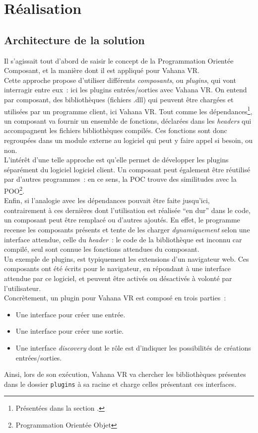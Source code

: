 \section{Réalisation}
\subsection{Architecture de la solution}
Il s'agissait tout d'abord de saisir le concept de la Programmation Orientée Composant, et la manière
dont il est appliqué pour Vahana VR.\\
Cette approche propose d'utiliser différents \emph{composants}, ou \textit{plugins},
qui vont interragir entre eux~: ici les plugins entrées/sorties avec Vahana VR. On entend
par composant, des bibliothèques (fichiers .dll) qui peuvent être chargées et utilisées
par un programme client, ici Vahana VR. Tout comme les dépendances\footnote{Présentées dans 
la section .}, un composant va fournir un ensemble
de fonctions, déclarées dans les \textit{headers} qui accompagnent les
fichiers bibliothèques compilés. Ces fonctions sont donc regroupées dans un module externe
au logiciel qui peut y faire appel si besoin, ou non.\\
L'intérêt d'une telle approche est qu'elle permet de développer les plugins séparément du logiciel
logiciel client. Un composant peut également être réutilisé par d'autres programmes~: en ce sens, la POC trouve
des similitudes avec la POO\footnote{Programmation Orientée Objet}.\\
Enfin, si l'analogie avec les dépendances pouvait être faite jusqu'ici, contrairement à ces
dernières dont l'utilisation est réalisée \enquote{en dur} dans le code, un composant
peut être remplacé ou d'autres ajoutés. En effet, le programme recense les composants
présents et tente de les charger \emph{dynamiquement} selon une interface attendue, celle du
\textit{header}~: le code de la bibliothèque est inconnu car compilé, seul sont
connue les fonctions attendues du composant.\\
Un exemple de plugins, est typiquement les extensions d'un navigateur web. Ces composants
ont été écrits pour le navigateur, en répondant à une interface attendue par ce logiciel,
et peuvent être activés ou désactivés à volonté par l'utilisateur.\\
\newline
Concrètement, un plugin pour Vahana VR est composé en trois parties~:
\begin{itemize}
  \item Une interface pour créer une entrée.
  \item Une interface pour créer une sortie.
  \item Une interface \textit{discovery} dont le rôle est d'indiquer les possibilités
    de créations entrées/sorties.
\end{itemize}
Ainsi, lors de son exécution, Vahana VR va chercher les bibliothèques présentes dans le dossier
\texttt{plugins} à sa racine et charge celles présentant ces interfaces.\\

